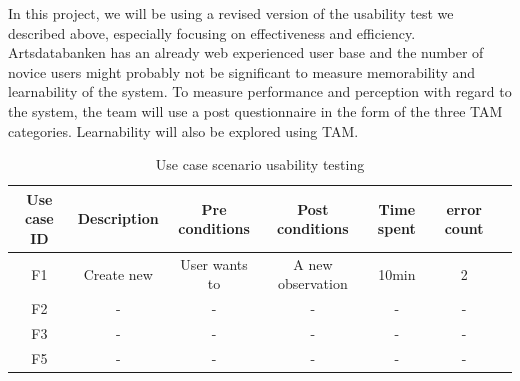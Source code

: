 In this project, we will be using a revised version of the usability test we described above, especially focusing on effectiveness and efficiency. Artsdatabanken has an already web experienced user base and the number of novice users might probably not be significant to measure memorability and learnability of the system.
To measure performance and perception with regard to the system, the team will use a post questionnaire in the form of the three TAM categories. Learnability will also be explored using TAM.

\begin{table}[h]
\centering
\caption{Use case scenario usability testing\cite{tam:doc5}} %

\begin{tabular}{|c|c|c|c|c|c|p{3cm}|} %
\hline\hline %
Use case ID & Description & Pre conditions & Post conditions & Time spent & error count \\

\hline %
F1 & Create new  & User wants to  & A new observation  & 10min & 2 \\
\hline
F2 & - & - & - & - & - \\
F3 & - & - & - & - & -\\
F5 & - & - & - & - & -\\
\hline %
\end{tabular}
\label{table:nonlin} %
\end{table}


